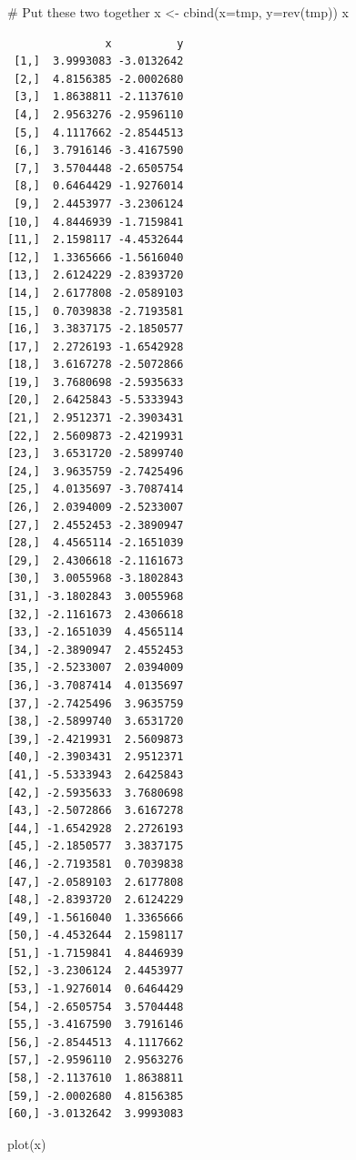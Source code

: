\documentclass[
  letterpaper,
  DIV=11,
  numbers=noendperiod]{scrartcl}
\newenvironment{Shaded}{\begin{snugshade}}{\end{snugshade}}
\newcommand{\AttributeTok}[1]{\textcolor[rgb]{0.40,0.45,0.13}{#1}}
\newcommand{\CommentTok}[1]{\textcolor[rgb]{0.37,0.37,0.37}{#1}}
\newcommand{\FunctionTok}[1]{\textcolor[rgb]{0.28,0.35,0.67}{#1}}
\newcommand{\NormalTok}[1]{\textcolor[rgb]{0.00,0.23,0.31}{#1}}
\newcommand{\OtherTok}[1]{\textcolor[rgb]{0.00,0.23,0.31}{#1}}
\begin{document}
\begin{Shaded}
\begin{Highlighting}[]
\CommentTok{\# Put these two together}
\NormalTok{x }\OtherTok{\textless{}{-}} \FunctionTok{cbind}\NormalTok{(}\AttributeTok{x=}\NormalTok{tmp, }\AttributeTok{y=}\FunctionTok{rev}\NormalTok{(tmp))}
\NormalTok{x}
\end{Highlighting}
\end{Shaded}

\begin{verbatim}
               x          y
 [1,]  3.9993083 -3.0132642
 [2,]  4.8156385 -2.0002680
 [3,]  1.8638811 -2.1137610
 [4,]  2.9563276 -2.9596110
 [5,]  4.1117662 -2.8544513
 [6,]  3.7916146 -3.4167590
 [7,]  3.5704448 -2.6505754
 [8,]  0.6464429 -1.9276014
 [9,]  2.4453977 -3.2306124
[10,]  4.8446939 -1.7159841
[11,]  2.1598117 -4.4532644
[12,]  1.3365666 -1.5616040
[13,]  2.6124229 -2.8393720
[14,]  2.6177808 -2.0589103
[15,]  0.7039838 -2.7193581
[16,]  3.3837175 -2.1850577
[17,]  2.2726193 -1.6542928
[18,]  3.6167278 -2.5072866
[19,]  3.7680698 -2.5935633
[20,]  2.6425843 -5.5333943
[21,]  2.9512371 -2.3903431
[22,]  2.5609873 -2.4219931
[23,]  3.6531720 -2.5899740
[24,]  3.9635759 -2.7425496
[25,]  4.0135697 -3.7087414
[26,]  2.0394009 -2.5233007
[27,]  2.4552453 -2.3890947
[28,]  4.4565114 -2.1651039
[29,]  2.4306618 -2.1161673
[30,]  3.0055968 -3.1802843
[31,] -3.1802843  3.0055968
[32,] -2.1161673  2.4306618
[33,] -2.1651039  4.4565114
[34,] -2.3890947  2.4552453
[35,] -2.5233007  2.0394009
[36,] -3.7087414  4.0135697
[37,] -2.7425496  3.9635759
[38,] -2.5899740  3.6531720
[39,] -2.4219931  2.5609873
[40,] -2.3903431  2.9512371
[41,] -5.5333943  2.6425843
[42,] -2.5935633  3.7680698
[43,] -2.5072866  3.6167278
[44,] -1.6542928  2.2726193
[45,] -2.1850577  3.3837175
[46,] -2.7193581  0.7039838
[47,] -2.0589103  2.6177808
[48,] -2.8393720  2.6124229
[49,] -1.5616040  1.3365666
[50,] -4.4532644  2.1598117
[51,] -1.7159841  4.8446939
[52,] -3.2306124  2.4453977
[53,] -1.9276014  0.6464429
[54,] -2.6505754  3.5704448
[55,] -3.4167590  3.7916146
[56,] -2.8544513  4.1117662
[57,] -2.9596110  2.9563276
[58,] -2.1137610  1.8638811
[59,] -2.0002680  4.8156385
[60,] -3.0132642  3.9993083
\end{verbatim}

\begin{Shaded}
\begin{Highlighting}[]
\FunctionTok{plot}\NormalTok{(x)}
\end{Highlighting}
\end{Shaded}
\end{document}

